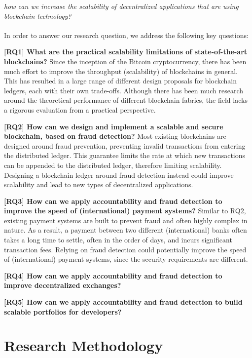 \emph{how can we increase the scalability of decentralized applications that are using blockchain technology?}\\\\
In order to answer our research question, we address the following key questions:

\textbf{[RQ1] What are the practical scalability limitations of state-of-the-art blockchains?}
Since the inception of the Bitcoin cryptocurrency, there has been much effort to improve the throughput (scalability) of blockchains in general.
This has resulted in a large range of different design proposals for blockchain ledgers, each with their own trade-offs.
Although there has been much research around the theoretical performance of different blockchain fabrics, the field lacks a rigorous evaluation from a practical perspective.

\textbf{[RQ2] How can we design and implement a scalable and secure blockchain, based on fraud detection?}
Most existing blockchains are designed around fraud prevention, preventing invalid transactions from entering the distributed ledger.
This guarantee limits the rate at which new transactions can be appended to the distributed ledger, therefore limiting scalability.
Designing a blockchain ledger around fraud detection instead could improve scalability and lead to new types of decentralized applications.

\textbf{[RQ3] How can we apply accountability and fraud detection to improve the speed of (international) payment systems?}
Similar to RQ2, existing payment systems are built to prevent fraud and often highly complex in nature.
As a result, a payment between two different (international) banks often takes a long time to settle, often in the order of days, and incurs significant transaction fees.
Relying on fraud detection could potentially improve the speed of (international) payment systems, since the security requirements are different.

\textbf{[RQ4] How can we apply accountability and fraud detection to improve decentralized exchanges?}

\textbf{[RQ5] How can we apply accountability and fraud detection to build scalable portfolios for developers?}

\section{Research Methodology}


